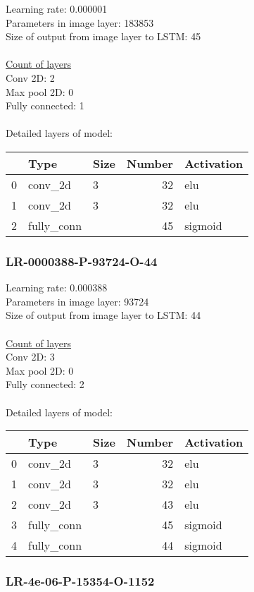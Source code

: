 Learning rate: 0.000001
\\Parameters in image layer: 183853
\\Size of output from image layer to LSTM: 45
\\\\\underline{Count of layers} 
\\Conv 2D:           2\\Max pool 2D:      0\\Fully connected:  1
\\\\Detailed layers of model: \\\begin{tabular}{rllrl}
\hline
    & Type       & Size   &   Number & Activation   \\
\hline
  0 & conv\_2d    & 3      &       32 & elu          \\
  1 & conv\_2d    & 3      &       32 & elu          \\
  2 & fully\_conn &        &       45 & sigmoid      \\
\hline
\end{tabular}\subsubsection*{LR-0000388-P-93724-O-44}
Learning rate: 0.000388
\\Parameters in image layer: 93724
\\Size of output from image layer to LSTM: 44
\\\\\underline{Count of layers} 
\\Conv 2D:           3\\Max pool 2D:      0\\Fully connected:  2
\\\\Detailed layers of model: \\\begin{tabular}{rllrl}
\hline
    & Type       & Size   &   Number & Activation   \\
\hline
  0 & conv\_2d    & 3      &       32 & elu          \\
  1 & conv\_2d    & 3      &       32 & elu          \\
  2 & conv\_2d    & 3      &       43 & elu          \\
  3 & fully\_conn &        &       45 & sigmoid      \\
  4 & fully\_conn &        &       44 & sigmoid      \\
\hline
\end{tabular}\subsubsection*{LR-4e-06-P-15354-O-1152}

